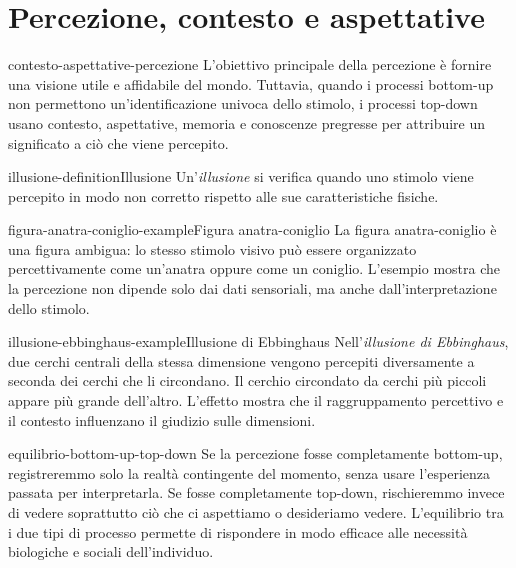 \documentclass[preview]{standalone}
\begin{document}
\genpage

\section{Percezione, contesto e aspettative}

\begin{snippet}{contesto-aspettative-percezione}
    L'obiettivo principale della percezione è fornire una visione utile e
    affidabile del mondo. Tuttavia, quando i processi bottom-up non permettono
    un'identificazione univoca dello stimolo, i processi top-down usano
    contesto, aspettative, memoria e conoscenze pregresse per attribuire un
    significato a ciò che viene percepito.
\end{snippet}

\begin{snippetdefinition}{illusione-definition}{Illusione}
    Un'\emph{illusione} si verifica quando uno stimolo viene percepito in modo
    non corretto rispetto alle sue caratteristiche fisiche.
\end{snippetdefinition}

\begin{snippetexample}{figura-anatra-coniglio-example}{Figura anatra-coniglio}
    La figura anatra-coniglio è una figura ambigua: lo stesso stimolo visivo può
    essere organizzato percettivamente come un'anatra oppure come un coniglio.
    L'esempio mostra che la percezione non dipende solo dai dati sensoriali, ma
    anche dall'interpretazione dello stimolo.
\end{snippetexample}


\begin{snippetexample}{illusione-ebbinghaus-example}{Illusione di Ebbinghaus}
    Nell'\emph{illusione di Ebbinghaus}, due cerchi centrali della stessa
    dimensione vengono percepiti diversamente a seconda dei cerchi che li
    circondano. Il cerchio circondato da cerchi più piccoli appare più grande
    dell'altro. L'effetto mostra che il raggruppamento percettivo e il contesto
    influenzano il giudizio sulle dimensioni.
\end{snippetexample}


\begin{snippet}{equilibrio-bottom-up-top-down}
    Se la percezione fosse completamente bottom-up, registreremmo solo la
    realtà contingente del momento, senza usare l'esperienza passata per
    interpretarla. Se fosse completamente top-down, rischieremmo invece di
    vedere soprattutto ciò che ci aspettiamo o desideriamo vedere. L'equilibrio
    tra i due tipi di processo permette di rispondere in modo efficace alle
    necessità biologiche e sociali dell'individuo.
\end{snippet}

\end{document}
